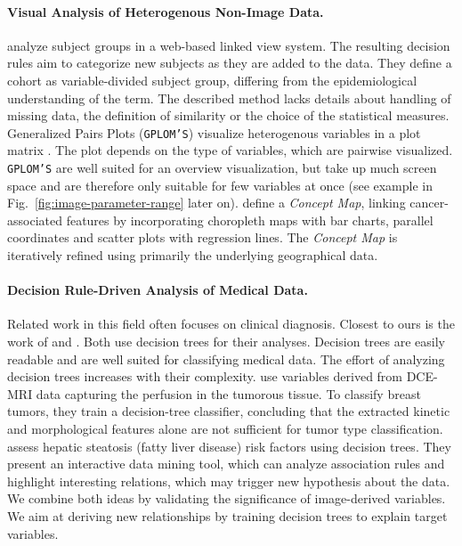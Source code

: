 \documentclass[a4paper,twoside]{style/article}
\begin{document}
\paragraph{Visual Analysis of Heterogenous Non-Image Data.}
\cite{Zhang} analyze subject groups in a web-based linked view system.
The resulting decision rules aim to categorize new subjects as they are added to the data.
They define a cohort as variable-divided subject group, differing from the epidemiological understanding of the term.
The described method lacks details about handling of missing data, the definition of similarity or the choice of the statistical measures.
Generalized Pairs Plots (\texttt{GPLOM'S}) visualize heterogenous variables in a plot matrix \cite{GPLOMS,Francois}.
The plot depends on the type of variables, which are pairwise visualized.
\texttt{GPLOM'S} are well suited for an overview visualization, but take up much screen space and are therefore only suitable for few variables at once (see example in Fig.~\ref{fig:image-parameter-range} later on).
\cite{Dai} define a \emph{Concept Map}, linking cancer-associated features by incorporating choropleth maps with bar charts, parallel coordinates and scatter plots with regression lines.
The \emph{Concept Map} is iteratively refined using primarily the underlying geographical data.
\paragraph{Decision Rule-Driven Analysis of Medical Data.}
Related work in this field often focuses on clinical diagnosis.
Closest to ours is the work of \cite{Glasser2013} and \cite{Niemann2014}.
Both use decision trees for their analyses.
Decision trees are easily readable and are well suited for classifying medical data.
The effort of analyzing decision trees increases with their complexity.
\cite{Glasser2013} use variables derived from DCE-MRI data capturing the perfusion in the tumorous tissue.
To classify breast tumors, they train a decision-tree classifier, concluding that the extracted kinetic and morphological features alone are not sufficient for tumor type classification.
\cite{Niemann2014} assess hepatic steatosis (fatty liver disease) risk factors using decision trees.
They present an interactive data mining tool, which can analyze association rules and highlight interesting relations, which may trigger new hypothesis about the data.
We combine both ideas by validating the significance of image-derived variables.
We aim at deriving new relationships by training decision trees to explain target variables.
\end{document}
